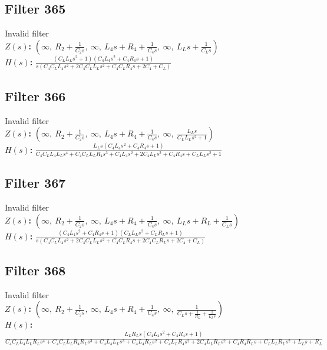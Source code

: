 \documentclass{article}
\begin{document}
\subsection*{Filter 365}
Invalid filter \\ 
\textbf{$Z(s)$:} $\left( \infty, \  R_{2} + \frac{1}{C_{2} s}, \  \infty, \  L_{4} s + R_{4} + \frac{1}{C_{4} s}, \  \infty, \  L_{L} s + \frac{1}{C_{L} s}\right)$ \\ 
\textbf{$H(s)$:} $\frac{\left(C_{L} L_{L} s^{2} + 1\right) \left(C_{4} L_{4} s^{2} + C_{4} R_{4} s + 1\right)}{s \left(C_{4} C_{L} L_{4} s^{2} + 2 C_{4} C_{L} L_{L} s^{2} + C_{4} C_{L} R_{4} s + 2 C_{4} + C_{L}\right)}$ \\ 
\subsection*{Filter 366}
Invalid filter \\ 
\textbf{$Z(s)$:} $\left( \infty, \  R_{2} + \frac{1}{C_{2} s}, \  \infty, \  L_{4} s + R_{4} + \frac{1}{C_{4} s}, \  \infty, \  \frac{L_{L} s}{C_{L} L_{L} s^{2} + 1}\right)$ \\ 
\textbf{$H(s)$:} $\frac{L_{L} s \left(C_{4} L_{4} s^{2} + C_{4} R_{4} s + 1\right)}{C_{4} C_{L} L_{4} L_{L} s^{4} + C_{4} C_{L} L_{L} R_{4} s^{3} + C_{4} L_{4} s^{2} + 2 C_{4} L_{L} s^{2} + C_{4} R_{4} s + C_{L} L_{L} s^{2} + 1}$ \\ 
\subsection*{Filter 367}
Invalid filter \\ 
\textbf{$Z(s)$:} $\left( \infty, \  R_{2} + \frac{1}{C_{2} s}, \  \infty, \  L_{4} s + R_{4} + \frac{1}{C_{4} s}, \  \infty, \  L_{L} s + R_{L} + \frac{1}{C_{L} s}\right)$ \\ 
\textbf{$H(s)$:} $\frac{\left(C_{4} L_{4} s^{2} + C_{4} R_{4} s + 1\right) \left(C_{L} L_{L} s^{2} + C_{L} R_{L} s + 1\right)}{s \left(C_{4} C_{L} L_{4} s^{2} + 2 C_{4} C_{L} L_{L} s^{2} + C_{4} C_{L} R_{4} s + 2 C_{4} C_{L} R_{L} s + 2 C_{4} + C_{L}\right)}$ \\ 
\subsection*{Filter 368}
Invalid filter \\ 
\textbf{$Z(s)$:} $\left( \infty, \  R_{2} + \frac{1}{C_{2} s}, \  \infty, \  L_{4} s + R_{4} + \frac{1}{C_{4} s}, \  \infty, \  \frac{1}{C_{L} s + \frac{1}{R_{L}} + \frac{1}{L_{L} s}}\right)$ \\ 
\textbf{$H(s)$:} $\frac{L_{L} R_{L} s \left(C_{4} L_{4} s^{2} + C_{4} R_{4} s + 1\right)}{C_{4} C_{L} L_{4} L_{L} R_{L} s^{4} + C_{4} C_{L} L_{L} R_{4} R_{L} s^{3} + C_{4} L_{4} L_{L} s^{3} + C_{4} L_{4} R_{L} s^{2} + C_{4} L_{L} R_{4} s^{2} + 2 C_{4} L_{L} R_{L} s^{2} + C_{4} R_{4} R_{L} s + C_{L} L_{L} R_{L} s^{2} + L_{L} s + R_{L}}$ \\ 
\end{document}
